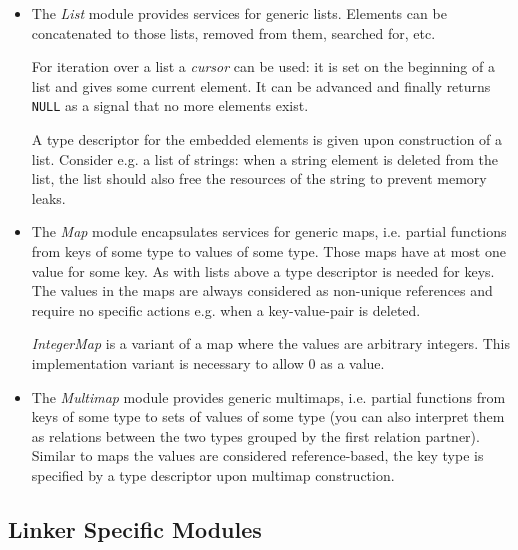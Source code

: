 \documentclass[10pt]{article}
\newcommand{\code}[1]{{\lstset{basicstyle=\normalsize\ttfamily}\lstinline!#1!}}
\newcommand{\definition}[1]{\emph{#1}}
\begin{document}
\begin{itemize}
  \item The \definition{List} module provides services for generic
        lists.  Elements can be concatenated to those lists, removed
        from them, searched for, etc.

        For iteration over a list a \definition{cursor} can be used:
        it is set on the beginning of a list and gives some current
        element.  It can be advanced and finally returns \code{NULL}
        as a signal that no more elements exist.

        A type descriptor for the embedded elements is given upon
        construction of a list.  Consider e.g. a list of strings: when
        a string element is deleted from the list, the list should
        also free the resources of the string to prevent memory leaks.

  \item The \definition{Map} module encapsulates services for generic
        maps, i.e. partial functions from keys of some type to values
        of some type.  Those maps have at most one value for some key.
        As with lists above a type descriptor is needed for keys.  The
        values in the maps are always considered as non-unique
        references and require no specific actions e.g. when a
        key-value-pair is deleted.

        \definition{IntegerMap} is a variant of a map where the values
        are arbitrary integers.  This implementation variant is
        necessary to allow 0 as a value.

  \item The \definition{Multimap} module provides generic multimaps,
        i.e. partial functions from keys of some type to sets of
        values of some type (you can also interpret them as relations
        between the two types grouped by the first relation partner).
        Similar to maps the values are considered reference-based, the
        key type is specified by a type descriptor upon multimap
        construction.

\end{itemize}













\subsection{Linker Specific Modules}
\end{document}
